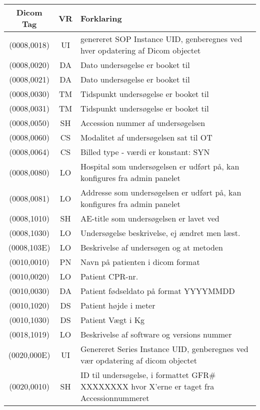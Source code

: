 \documentclass{article}
\begin{document}
\begin{table}
\begin{center}
\begin{tabular}{|c|c|p{7cm}|}\hline
	Dicom Tag   & VR & Forklaring \\ \hline
	(0008,0018) & UI & genereret SOP Instance UID, genberegnes ved hver opdatering af Dicom objectet \\ \hline
	(0008,0020) & DA & Dato undersøgelse er booket til \\ \hline
	(0008,0021) & DA & Dato undersøgelse er booket til \\ \hline	
	(0008,0030) & TM & Tidspunkt undersøgelse er booket til \\ \hline
	(0008,0031) & TM & Tidspunkt undersøgelse er booket til \\ \hline	
	(0008,0050) & SH & Accession nummer af undersøgelsen \\ \hline 
	(0008,0060) & CS & Modalitet af undersøgelsen sat til OT \\ \hline
	(0008,0064) & CS & Billed type - værdi er konstant: SYN \\ \hline
	(0008,0080) & LO & Hospital som undersøgelsen er udført på, kan konfigures fra admin panelet \\ \hline
	(0008,0081) & LO & Addresse som undersøgelsen er udført på, kan konfigures fra admin panelet \\ \hline
	(0008,1010) & SH & AE-title som undersøgelsen er lavet ved \\ \hline
	(0008,1030) & LO & Undersøgelse beskrivelse, ej ændret men læst. \\ \hline
	(0008,103E) & LO & Beskrivelse af undersøgen og at metoden \\ \hline
	(0010,0010) & PN & Navn på patienten i dicom format \\ \hline
	(0010,0020) & LO & Patient CPR-nr. \\ \hline
	(0010,0030) & DA & Patient fødseldato på format YYYYMMDD \\ \hline
	(0010,1020) & DS & Patient højde i meter \\ \hline
	(0010,1030) & DS & Patient Vægt i Kg \\ \hline
	(0018,1019)	& LO & Beskrivelse af software og versions nummer \\ \hline
	(0020,000E) & UI & Genereret Series Instance UID, genberegnes ved vær opdatering af dicom objectet \\ \hline
	(0020,0010) & SH & ID til undersøgelse, i formattet GFR\# XXXXXXXX hvor X'erne er taget fra Accessionnummeret \\ \hline

\end{tabular}
\end{center}
\end{table}
\end{document}
